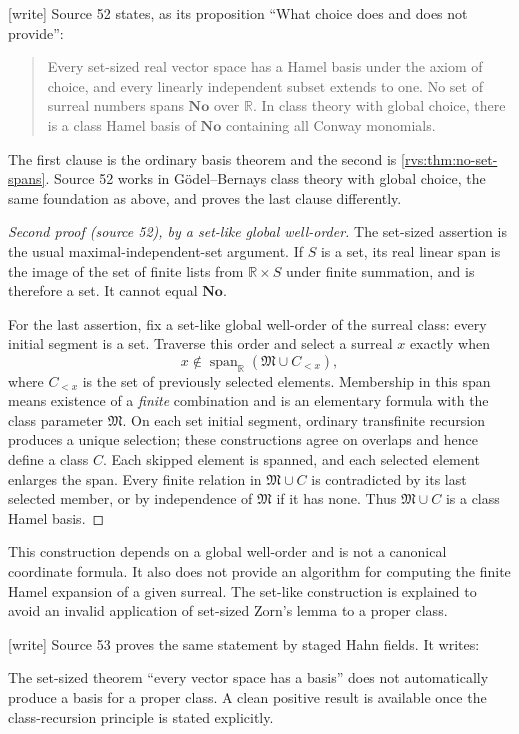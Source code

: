 \documentclass[11pt,letterpaper]{article}
\numberwithin{equation}{section}
\theoremstyle{definition}
\theoremstyle{remark}
\newcommand{\No}{\mathbf{No}}
\newcommand{\R}{\mathbb{R}}
\newcommand{\M}{\mathfrak{M}}
\newcommand{\Span}{\operatorname{span}}
\newcommand{\wtag}{\textup{[write]}}%
\begin{document}
\noindent\wtag{} Source 52 states, as its proposition ``What choice does
and does not provide'':
\begin{quote}

Every set-sized real vector space has a Hamel basis under the axiom of choice, and every linearly independent subset extends to one. No set of surreal numbers spans $\No$ over $\R$. In class theory with global choice, there is a class Hamel basis of $\No$ containing all Conway monomials.
\end{quote}
The first clause is the ordinary basis theorem and the second is
\cref{rvs:thm:no-set-spans}.  Source 52 works in G\"odel--Bernays class theory
with global choice, the same foundation as above, and proves the last clause
differently.
\begin{proof}[Second proof (source 52), by a set-like global well-order]

The set-sized assertion is the usual maximal-independent-set argument. If $S$ is a set, its real linear span is the image of the set of finite lists from $\R\times S$ under finite summation, and is therefore a set. It cannot equal $\No$.

For the last assertion, fix a set-like global well-order of the surreal class: every initial segment is a set. Traverse this order and select a surreal $x$ exactly when
\[
 x\notin\Span_\R(\M\cup C_{<x}),
\]
where $C_{<x}$ is the set of previously selected elements. Membership in this span means existence of a \emph{finite} combination and is an elementary formula with the class parameter $\M$. On each set initial segment, ordinary transfinite recursion produces a unique selection; these constructions agree on overlaps and hence define a class $C$. Each skipped element is spanned, and each selected element enlarges the span. Every finite relation in $\M\cup C$ is contradicted by its last selected member, or by independence of $\M$ if it has none. Thus $\M\cup C$ is a class Hamel basis.
\end{proof}

This construction depends on a global well-order and is not a canonical coordinate formula. It also does not provide an algorithm for computing the finite Hamel expansion of a given surreal. The set-like construction is explained to avoid an invalid application of set-sized Zorn's lemma to a proper class.

\noindent\wtag{} Source 53 proves the same statement by staged Hahn fields.
It writes:

The set-sized theorem ``every vector space has a basis'' does not automatically
produce a basis for a proper class. A clean positive result is available once the
class-recursion principle is stated explicitly.
\end{document}
